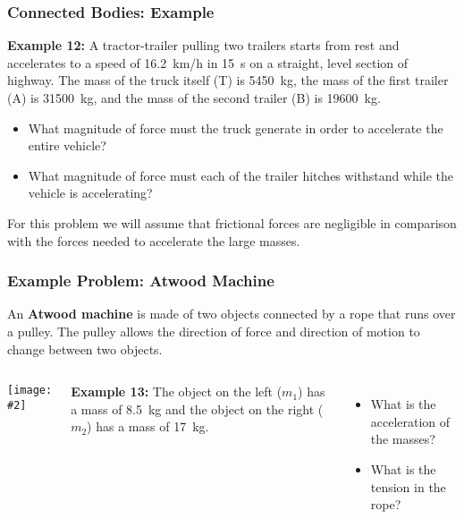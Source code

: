 \documentclass[12pt,compress,aspectratio=169]{beamer}
\newcommand{\pic}[2]{\texttt{[image: \#2]}}
\begin{document}
\begin{frame}
  \frametitle{Connected Bodies: Example}
  \textbf{Example 12:} A tractor-trailer pulling two trailers starts from rest
  and accelerates to a speed of \SI{16.2}{km/h} in \SI{15}{s} on a straight,
  level
  section of highway. The mass of the truck itself (T) is \SI{5450}{kg}, the
  mass of the first trailer (A) is \SI{31500}{kg}, and the mass of the second
  trailer (B) is \SI{19600}{kg}.
  \begin{itemize}
  \item What magnitude of force must the truck generate in order to accelerate
    the entire vehicle?
  \item What magnitude of force must each of the trailer hitches withstand
    while the vehicle is accelerating?
  \end{itemize}
  For this problem we will assume that frictional forces are negligible in
  comparison with the forces needed to accelerate the large masses.
\end{frame}






\begin{frame}
  \frametitle{Example Problem: Atwood Machine}
  An \textbf{Atwood machine} is made of two objects connected by a rope that
  runs over a pulley. The pulley allows the direction of force and direction
  of motion to change between two objects.
  \begin{columns}
    \begin{center}
      \pic{1}{graphics/atwood.png}
    \end{center}
    \textbf{Example 13:} The object on the left ($m_1$) has a mass of
    \SI{8.5}{kg} and the object on the right ($m_2$) has a mass of \SI{17}{kg}.
    \begin{itemize}
    \item What is the acceleration of the masses?
    \item What is the tension in the rope?
    \end{itemize}
  \end{columns}
\end{frame}
\end{document}
